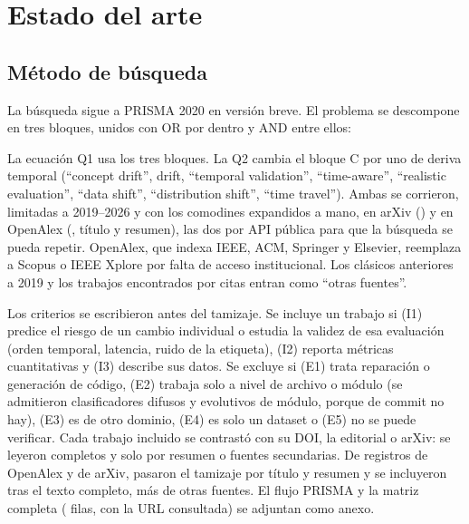 \documentclass[conference,letterpaper]{IEEEtran}
\begin{document}
\section{Estado del arte}

\subsection{Método de búsqueda}
La búsqueda sigue a PRISMA 2020 \cite{Page2021} en versión breve. El problema se descompone en tres bloques, unidos con OR por dentro y AND entre ellos:

\noindent{}

\smallskip
La ecuación Q1 usa los tres bloques. La Q2 cambia el bloque C por uno de deriva temporal (``concept drift'', drift, ``temporal validation'', ``time-aware'', ``realistic evaluation'', ``data shift'', ``distribution shift'', ``time travel''). Ambas se corrieron, limitadas a 2019--2026 y con los comodines expandidos a mano, en arXiv (\fechaConsulta) y en OpenAlex (\fechaConsultaOa, título y resumen), las dos por API pública para que la búsqueda se pueda repetir. OpenAlex, que indexa IEEE, ACM, Springer y Elsevier, reemplaza a Scopus o IEEE Xplore por falta de acceso institucional. Los clásicos anteriores a 2019 y los trabajos encontrados por citas entran como ``otras fuentes''.

Los criterios se escribieron antes del tamizaje. Se incluye un trabajo si (I1) predice el riesgo de un cambio individual o estudia la validez de esa evaluación (orden temporal, latencia, ruido de la etiqueta), (I2) reporta métricas cuantitativas y (I3) describe sus datos. Se excluye si (E1) trata reparación o generación de código, (E2) trabaja solo a nivel de archivo o módulo (se admitieron clasificadores difusos y evolutivos de módulo, porque de commit no hay), (E3) es de otro dominio, (E4) es solo un dataset o (E5) no se puede verificar. Cada trabajo incluido se contrastó con su DOI, la editorial o arXiv: \nTextoCompleto{} se leyeron completos y \nSoloResumen{} solo por resumen o fuentes secundarias. De \nOaTotal{} registros de OpenAlex y \nArxivTotal{} de arXiv, \nPasan{} pasaron el tamizaje por título y resumen y \nIncluidosBases{} se incluyeron tras el texto completo, más \nOtros{} de otras fuentes. El flujo PRISMA y la matriz completa (\nTotalIncluidos{} filas, con la URL consultada) se adjuntan como anexo.
\end{document}
